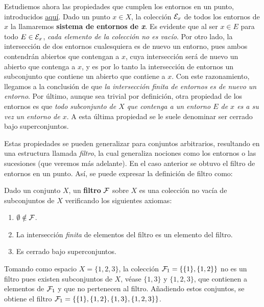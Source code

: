 \begin{amp}
    \bigskip

    Estudiemos ahora las propiedades que cumplen los entornos en un punto, introducidos \hyperlink{sec:entornos}{aquí}. Dado un punto $x\in X$, la colección $\mathcal{E}_x$ de todos los entornos de $x$ la llamaremos {\bf sistema de entornos de \textit{x}}. Es evidente que al ser $x\in E$ para todo $E\in\mathcal{E}_x$, \textit{cada elemento de la colección no es vacío}. Por otro lado, la intersección de dos entornos cualesquiera es de nuevo un entorno, pues ambos contendrán abiertos que contengan a $x$, cuya intersección será de nuevo un abierto que contenga a $x$, y es por lo tanto la intersección de entornos un subconjunto que contiene un abierto que contiene a $x$. Con este razonamiento, llegamos a la conclusión de que \textit{la intersección finita de entornos es de nuevo un entorno}. Por último, aunque sea trivial por definición, otra propiedad de los entornos es que \textit{todo subconjunto de $X$ que contenga a un entorno $E$ de $x$ es a su vez un entorno de $x$}. A esta última propiedad se le suele denominar ser cerrado bajo superconjuntos.

    Estas propiedades se pueden generalizar para conjuntos arbitrarios, resultando en una estructura llamada \textit{filtro}, la cual generaliza nociones como los entornos o las sucesiones (que veremos más adelante). En el caso anterior se obtuvo el filtro de entornos en un punto. Así, se puede expresar la definición de filtro como:

    \begin{deff}
        Dado un conjunto $X$, un {\bf filtro} $\mathcal{F}$ sobre $X$ es una colección no vacía de subconjuntos de $X$ verificando los siguientes axiomas:
        \begin{enumerate}[leftmargin=15pt,itemsep=0pt, topsep=5pt]
            \item $\emptyset \notin \mathcal{F}$.
            \item La intersección {\it finita} de elementos del filtro es un elemento del filtro.
            \item Es cerrado bajo superconjuntos.
    \end{enumerate}
    \end{deff}

    \begin{ej}
        Tomando como espacio $X = \{1,2,3\}$, la colección $\mathcal{F}_1 = \{\{1\}, \{1,2\}\}$ no es un filtro pues existen subconjuntos de $X$, véase $\{1,3\}$ y $\{1,2,3\}$, que contienen a elementos de $\mathcal{F}_1$ y que no pertenecen al filtro. Añadiendo estos conjuntos, se obtiene el filtro $\mathcal{F}_1 = \{\{1\}, \{1,2\},\{1,3\},\{1,2,3\}\}$.
    \end{ej}


\end{amp}
